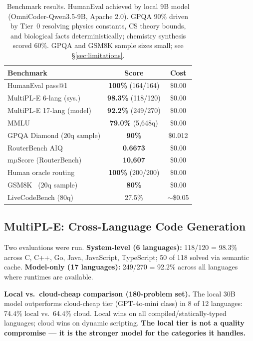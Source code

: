 \documentclass[11pt]{article}
\begin{document}
\begin{table}[t]
\centering
\small
\begin{tabular}{lcc}
\toprule
\textbf{Benchmark} & \textbf{Score} & \textbf{Cost} \\
\midrule
HumanEval pass@1~\cite{chen2021humaneval} & \textbf{100\%} (164/164) & \$0.00 \\
MultiPL-E 6-lang (sys.)~\cite{cassano2022multipl} & \textbf{98.3\%} (118/120) & \$0.00 \\
MultiPL-E 17-lang (model) & \textbf{92.2\%} (249/270) & \$0.00 \\
MMLU~\cite{hendrycks2021mmlu} & \textbf{79.0\%} (5,648q) & \$0.00 \\
GPQA Diamond (20q sample) & \textbf{90\%} & \$0.012 \\
RouterBench AIQ~\cite{withmartian2024routerbench} & \textbf{0.6673} & \$0.00 \\
m$\mu$Score (RouterBench) & \textbf{10,607} & \$0.00 \\
Human oracle routing & \textbf{100\%} (200/200) & \$0.00 \\
GSM8K~\cite{cobbe2021gsm8k} (20q sample) & \textbf{80\%} & \$0.00 \\
LiveCodeBench (80q) & 27.5\% & $\sim$\$0.05 \\
\bottomrule
\end{tabular}
\caption{Benchmark results. HumanEval achieved by local 9B model
(OmniCoder-Qwen3.5-9B, Apache 2.0). GPQA 90\% driven by Tier~0
resolving physics constants, CS theory bounds, and biological facts
deterministically; chemistry synthesis scored 60\%. GPQA and GSM8K
sample sizes small; see \S\ref{sec:limitations}.}
\label{tab:benchmarks}
\end{table}

\subsection{MultiPL-E: Cross-Language Code Generation}
\label{sec:multipl}

Two evaluations were run. \textbf{System-level (6 languages):} 118/120
= 98.3\% across C, C++, Go, Java, JavaScript, TypeScript; 50 of 118
solved via semantic cache. \textbf{Model-only (17 languages):} 249/270
= 92.2\% across all languages where runtimes are available.

\textbf{Local vs.\ cloud-cheap comparison (180-problem set).}
The local 30B model outperforms cloud-cheap tier (GPT-4o-mini class)
in 8 of 12 languages: 74.4\% local vs.\ 64.4\% cloud. Local wins
on all compiled/statically-typed languages; cloud wins on dynamic
scripting. \textbf{The local tier is not a quality compromise --- it is
the stronger model for the categories it handles.}
\end{document}
